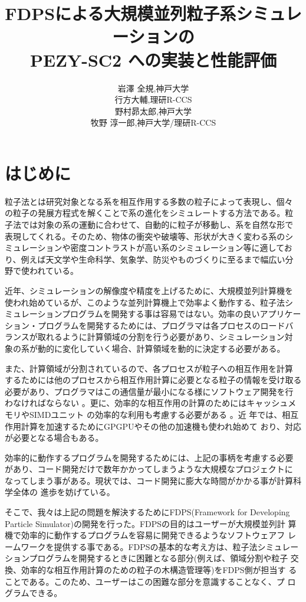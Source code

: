 \documentclass[a4j]{jarticle}
\title{FDPSによる大規模並列粒子系シミュレーションの \\PEZY-SC2 への実装と性能評価}
\author{\begin{tabular}{cl}
&岩澤 全規,神戸大学 \\
& 行方大輔,理研R-CCS \\
&野村昴太郎,神戸大学 \\
    & 牧野 淳一郎,神戸大学/理研R-CCS \\
\end{tabular} }
\begin{document}
\maketitle



\section{はじめに}

粒子法とは研究対象となる系を相互作用する多数の粒子によって表現し、個々
の粒子の発展方程式を解くことで系の進化をシミュレートする方法である。粒
子法では対象の系の運動に合わせて、自動的に粒子が移動し、系を自然な形で
表現してくれる。そのため、物体の衝突や破壊等、形状が大きく変わる系のシ
ミュレーションや密度コントラストが高い系のシミュレーション等に適してお
り、例えば天文学や生命科学、気象学、防災やものづくりに至るまで幅広い分
野で使われている。

近年、シミュレーションの解像度や精度を上げるために、大規模並列計算機を
使われ始めているが、このような並列計算機上で効率よく動作する、粒子法シ
ミュレーションプログラムを開発する事は容易ではない。効率の良いアプリケー
ション・プログラムを開発するためには、プログラマは各プロセスのロードバ
ランスが取れるように計算領域の分割を行う必要があり、シミュレーション対
象の系が動的に変化していく場合、計算領域を動的に決定する必要がある。

また、計算領域が分割されているので、各プロセスが粒子への相互作用を計算
するためには他のプロセスから相互作用計算に必要となる粒子の情報を受け取る
必要があり、プログラマはこの通信量が最小になる様にソフトウェア開発を行
わなければならない
\cite{WarrenSalmon1992,Makino2004,Springeletal2000,Ishiyamaetal2009b}
。更に、効率的な相互作用の計算のためにはキャッシュメモリやSIMDユニット
の効率的な利用も考慮する必要がある
\cite{2006NewA...12..169N,2012NewA...17...82T,2013NewA...19...74T}。近
年では、相互作用計算を加速するためにGPGPUやその他の加速機も使われ始めて
おり、対応が必要となる場合もある。
\cite{Hamadaetal2009a,Hamadaetal2009b,Bedorf:2014:PGT:2683593.2683600}
 
効率的に動作するプログラムを開発するためには、上記の事柄を考慮する必要
があり、コード開発だけで数年かかってしまうような大規模なプロジェクトに
なってしまう事がある。現状では、コード開発に膨大な時間がかかる事が計算科学全体の
進歩を妨げている。


そこで、我々は上記の問題を解決するためにFDPS(Framework for Developing
Particle Simulator)の開発を行った。FDPSの目的はユーザーが大規模並列計
算機で効率的に動作するプログラムを容易に開発できるようなソフトウェアフ
レームワークを提供する事である。FDPSの基本的な考え方は、粒子法シミュレー
ションプログラムを開発するときに困難となる部分(例えば、領域分割や粒子
交換、効率的な相互作用計算のための粒子の木構造管理等)をFDPS側が担当す
ることである。このため、ユーザーはこの困難な部分を意識することなく、プ
ログラムできる。
\end{document}
